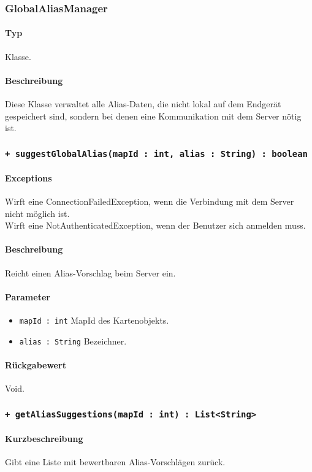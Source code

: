 \subsubsection{GlobalAliasManager}
\paragraph*{Typ}
Klasse.
\paragraph*{Beschreibung}
Diese Klasse verwaltet alle Alias-Daten, die nicht lokal auf dem Endgerät gespeichert sind, 
sondern bei denen eine Kommunikation mit dem Server nötig ist.

\subsubsection*{\texttt{+ suggestGlobalAlias(mapId : int, alias : String) : boolean}}%
\paragraph*{Exceptions}
Wirft eine ConnectionFailedException, wenn die Verbindung mit dem Server nicht möglich ist.\\
Wirft eine NotAuthenticatedException, wenn der Benutzer sich anmelden muss.
\paragraph*{Beschreibung}
Reicht einen Alias-Vorschlag beim Server ein.
\paragraph*{Parameter}
\begin{itemize}
    \item \texttt{mapId : int} MapId des Kartenobjekts.
    \item \texttt{alias : String} Bezeichner.
\end{itemize}
\paragraph*{Rückgabewert}
Void.

\subsubsection*{\texttt{+ getAliasSuggestions(mapId : int) : List<String>}}%
\paragraph*{Kurzbeschreibung}
Gibt eine Liste mit bewertbaren Alias-Vorschlägen zurück.
